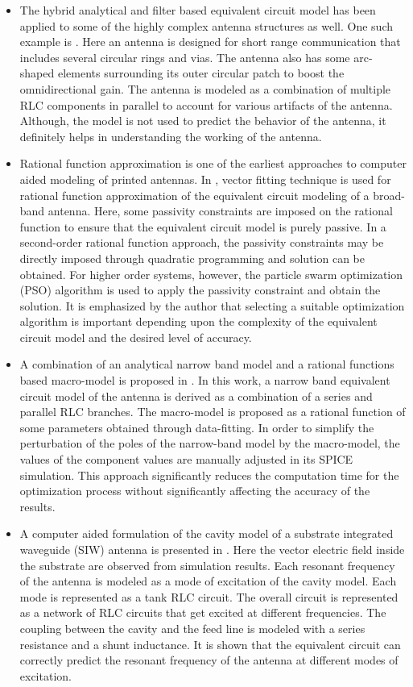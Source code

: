 \begin{itemize}
\item The hybrid analytical and filter based equivalent circuit model has been applied to some of the highly complex antenna structures as well. One such example is \cite{ana_eqckt_ex1}. Here an antenna is designed for short range communication that includes several circular rings and vias. The antenna also has some arc-shaped elements surrounding its outer circular patch to boost the omnidirectional gain. The antenna is modeled as a combination of multiple RLC components in parallel to account for various artifacts of the antenna. Although, the model is not used to predict the behavior of the antenna, it definitely helps in understanding the working of the antenna.
\item Rational function approximation is one of the earliest approaches to computer aided modeling of printed antennas. In \cite{comp-aided-eqckt}, vector fitting technique is used for rational function approximation of the equivalent circuit modeling of a broad-band antenna. Here, some passivity constraints are imposed on the rational function to ensure that the equivalent circuit model is purely passive. In a second-order rational function approach, the passivity constraints may be directly imposed through quadratic programming and solution can be obtained. For higher order systems, however, the particle swarm optimization (PSO) algorithm is used to apply the passivity constraint and obtain the solution. It is emphasized by the author that selecting a suitable optimization algorithm is important depending upon the complexity of the equivalent circuit model and the desired level of accuracy.
\item A combination of an analytical narrow band model and a rational functions based macro-model is proposed in \cite{UwbPmaEqCkt1}. In this work, a narrow band equivalent circuit model of the antenna is derived as a combination of a series and parallel RLC branches. The macro-model is proposed as a rational function of some parameters obtained through data-fitting. In order to simplify the perturbation of the poles of the narrow-band model by the macro-model, the values of the component values are manually adjusted in its SPICE simulation. This approach significantly reduces the computation time for the optimization process without significantly affecting the accuracy of the results.
\item A computer aided formulation of the cavity model of a substrate integrated waveguide (SIW) antenna is presented in \cite{comp-aided-eqckt2}. Here the vector electric field inside the substrate are observed from simulation results. Each resonant frequency of the antenna is modeled as a mode of excitation of the cavity model. Each mode is represented as a tank RLC circuit. The overall circuit is represented as a network of RLC circuits that get excited at different frequencies. The coupling between the cavity and the feed line is modeled with a series resistance and a shunt inductance. It is shown that the equivalent circuit can correctly predict the resonant frequency of the antenna at different modes of excitation.

\end{itemize}
